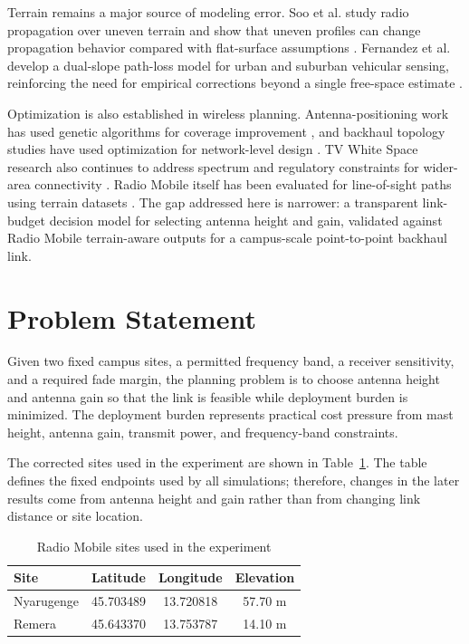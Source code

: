 \documentclass[journal]{IEEEtran}
\begin{document}
Terrain remains a major source of modeling error. Soo et al. study radio propagation over uneven terrain and show that uneven profiles can change propagation behavior compared with flat-surface assumptions \cite{soo2025radio}. Fernandez et al. develop a dual-slope path-loss model for urban and suburban vehicular sensing, reinforcing the need for empirical corrections beyond a single free-space estimate \cite{fernandez2024dual}.

Optimization is also established in wireless planning. Antenna-positioning work has used genetic algorithms for coverage improvement \cite{callesesteban2024optimizing}, and backhaul topology studies have used optimization for network-level design \cite{hernandez2024spectral,khaturia2019efficient}. TV White Space research also continues to address spectrum and regulatory constraints for wider-area connectivity \cite{cunha2025impact,mach2023improved}. Radio Mobile itself has been evaluated for line-of-sight paths using terrain datasets \cite{kaschel2019analysis}. The gap addressed here is narrower: a transparent link-budget decision model for selecting antenna height and gain, validated against Radio Mobile terrain-aware outputs for a campus-scale point-to-point backhaul link.

\section{Problem Statement}

Given two fixed campus sites, a permitted frequency band, a receiver sensitivity, and a required fade margin, the planning problem is to choose antenna height and antenna gain so that the link is feasible while deployment burden is minimized. The deployment burden represents practical cost pressure from mast height, antenna gain, transmit power, and frequency-band constraints.

The corrected sites used in the experiment are shown in Table~\ref{tab:sites}.
The table defines the fixed endpoints used by all simulations; therefore, changes in the later results come from antenna height and gain rather than from changing link distance or site location.

\begin{table}[!htbp]
\centering
\caption{Radio Mobile sites used in the experiment}
\label{tab:sites}
\begin{tabular}{lccc}
\toprule
Site & Latitude & Longitude & Elevation\\
\midrule
Nyarugenge & 45.703489 & 13.720818 & 57.70 m\\
Remera & 45.643370 & 13.753787 & 14.10 m\\
\bottomrule
\end{tabular}
\end{table}
\end{document}
